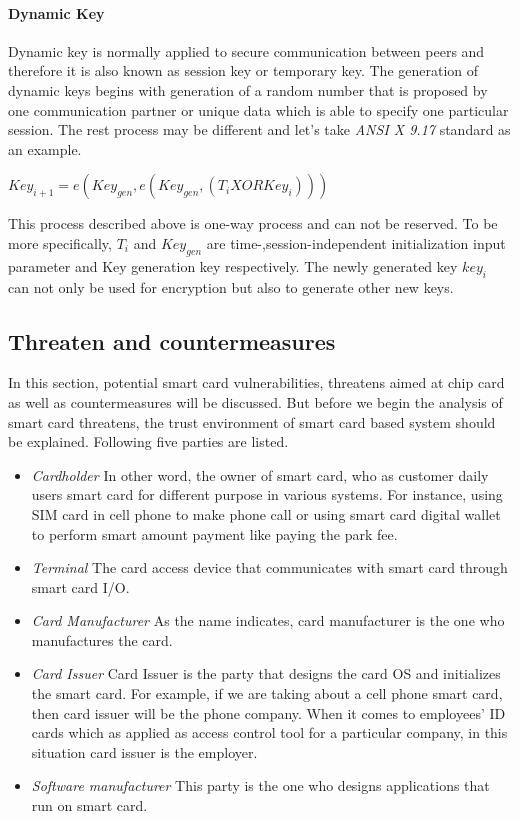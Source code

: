 \paragraph{Dynamic Key}
Dynamic key is normally applied to secure communication between peers and therefore it is also known as session key or temporary key. The generation of dynamic keys begins with generation of a random number that is proposed by one communication partner or unique data which is able to specify one particular session. The rest process may be different and let's take \emph{ANSI X 9.17} standard as an example\cite{handbook}. 
\begin{center}
$Key_{i+1} = e(Key_{gen},e(Key_{gen},(T_{i} XOR Key_{i})))$
\end{center}
This process described above is one-way process and can not be reserved. To be more specifically, $T_{i}$ and  $Key_{gen}$ are time-,session-independent initialization input parameter and Key generation key respectively. The newly generated  key $key_{i}$ can not only be used for encryption but also to generate other new keys.
\subsection{Threaten and countermeasures}
In this section, potential smart card vulnerabilities, threatens aimed at chip card as well as countermeasures will be discussed. But before we begin the analysis of smart card threatens, the trust environment of smart card based system should be explained. Following five parties are listed\cite{smart_card_attack1}.
\begin{itemize}
\item \emph{Cardholder} In other word, the owner of smart card, who as customer daily users smart card for different purpose  in various systems. For instance, using SIM card in cell phone to make phone call or using smart card digital wallet to perform smart amount payment like paying the park fee.
\item \emph{Terminal} The card access device that communicates with smart card through smart card I/O.
\item \emph{Card Manufacturer} As the name indicates, card manufacturer is the one who manufactures  the card.
\item \emph{Card Issuer} Card Issuer is the party that designs the card OS and initializes the smart card. For example, if we are taking about a cell phone smart card, then card issuer will be the phone company. When it comes to employees' ID cards which as applied as access control tool for a particular company, in this situation card issuer is the employer.
\item \emph{Software manufacturer} This party is the one who designs applications that run on smart card.
\end{itemize}
